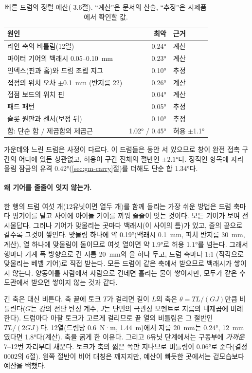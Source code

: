 \begin{table}[ht]
\centering
\caption{빠른 드럼의 정렬 예산( 3.6절). ``계산''은 문서의 산술, ``추정''은 시제품에서 확인할 값.}
\label{tab:gm-budget}
\small
\begin{tabular}{lrl}
\toprule
원인 & 최악 & 근거 \\
\midrule
라인 축의 비틀림(12열) & 0.24° & 계산 \\
마이터 기어의 백래시 0.05--0.10~mm & 0.23° & 계산 \\
인덱스(핀과 홈)와 드럼 조립 지그 & 0.10° & 추정 \\
접점의 위치 오차 $\pm$0.1~mm (반지름 22) & 0.26° & 계산 \\
접점 보드의 위치 핀 & 0.04° & 계산 \\
패드 패턴 & 0.05° & 추정 \\
슬롯 원판과 센서(보정 뒤) & 0.10° & 추정 \\
\midrule
합: 단순 합 / 제곱합의 제곱근 & 1.02° / 0.45° & 허용 $\pm$1.1° \\
\bottomrule
\end{tabular}
\end{table}

가운데와 느린 드럼은 사정이 다르다. 이 드럼들은  동안 서 있으므로 창이 완전 접촉 구간의 어디에 있든
상관없고, 허용이 구간 전체의 절반인 $\pm 2.1°$다. 정적인 항목에 자리올림 잠금의 유격 0.42°(\ref{sec:gm-carry}절)를
더해도 단순 합 1.34°다.

\paragraph{왜 기어를 줄줄이 잇지 않는가.} 한 행의 드럼 여섯 개(12유닛이면 열두 개)를 함께 돌리는 가장 쉬운 방법은
드럼 축마다 평기어를 달고 사이에 아이들 기어를 끼워 줄줄이 잇는 것이다. 모든 기어가 보여 전시물답다. 그러나 기어가
맞물리는 곳마다 백래시(이 사이의 틈)가 있고, 줄의 끝으로 갈수록 그것이 쌓인다. 맞물림 하나에 약 0.19°(백래시
0.1~mm, 피치 반지름 30~mm, 계산), 열 하나에 맞물림이 둘이므로 여섯 열이면 약 1.9°로 허용 1.1°를 넘는다. 그래서 행마다
기계 폭 방향으로 긴 지름 20~mm의 을 하나 두고, 드럼 축마다 1:1 (직각으로 맞물리는 베벨 기어)로 직접 받는다. 모든 드럼이 같은 축에서 받으므로 백래시가 쌓이지 않는다.
양동이를 사람에서 사람으로 건네면 흘리는 물이 쌓이지만, 모두가 같은 수도관에서 받으면 쌓이지 않는 것과 같다.

긴 축은 대신 비튼다. 축 끝에 토크 $T$가 걸리면 길이 $L$의 축은 $\theta = TL/(GJ)$만큼 비틀린다($G$는 강의 전단 탄성
계수, $J$는 단면의 극관성 모멘트로 지름의 네제곱에 비례한다). 드럼마다 마찰 토크가 고르게 걸리므로 끝 열의 비틀림은
그 절반인 $TL/(2GJ)$다. 12열(드럼당 0.6~N·m, 1.44~m)에서 지름 20~mm는 0.24°, 12~mm였다면 1.8°다(계산). 축을 굵게 한
이유다. 그리고 6유닛 단계에서는 구동부에 \emph{가까운} 7--12번 자리부터 채운다. 토크가 축의 짧은 쪽만 지나므로
비틀림이 0.06°로 준다(결정 0002의 6절). 왼쪽 절반이 비어 대칭은 깨지지만, 예산이 빠듯한 곳에서는 겉모습보다 예산을
택했다.

